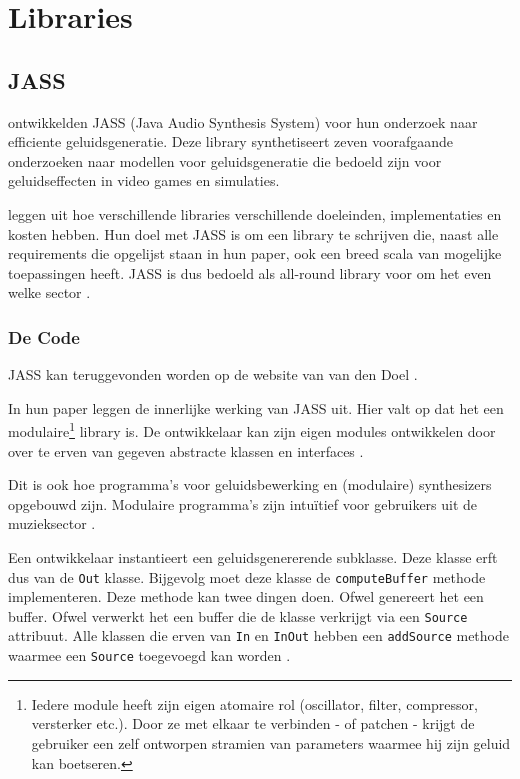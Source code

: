 \section{Libraries}

\subsection{JASS}

\textcite{jass} ontwikkelden JASS (Java Audio Synthesis System) voor hun onderzoek naar efficiente geluidsgeneratie. Deze library synthetiseert zeven voorafgaande onderzoeken naar modellen voor geluidsgeneratie die bedoeld zijn voor geluidseffecten in video games en simulaties. 

\textcite{jass} leggen uit hoe verschillende libraries verschillende doeleinden, implementaties en kosten hebben. Hun doel met JASS is om een library te schrijven die, naast alle requirements die opgelijst staan in hun paper, ook een breed scala van mogelijke toepassingen heeft. JASS is dus bedoeld als all-round library voor om het even welke sector \autocite{jass}.

\subsubsection*{De Code}
\label{sec:jass_code}

JASS kan teruggevonden worden op de website van van den Doel \autocite{jasscode}.

In hun paper leggen \textcite{jass} de innerlijke werking van JASS uit. Hier valt op dat het een modulaire\footnote{Iedere module heeft zijn eigen atomaire rol (oscillator, filter, compressor, versterker etc.). Door ze met elkaar te verbinden - of patchen - krijgt de gebruiker een zelf ontworpen stramien van parameters waarmee hij zijn geluid kan boetseren.} library is. De ontwikkelaar kan zijn eigen modules ontwikkelen door over te erven van gegeven abstracte klassen en interfaces  \autocite{jass}. 

Dit is ook hoe programma's voor geluidsbewerking en (modulaire) synthesizers opgebouwd zijn. Modulaire programma's zijn intuïtief voor gebruikers uit de muzieksector \autocite{bartvincent}.

Een ontwikkelaar instantieert een geluidsgenererende subklasse. Deze klasse erft dus van de \verb+Out+ klasse. Bijgevolg moet deze klasse de \verb+computeBuffer+ methode implementeren. Deze methode kan twee dingen doen. Ofwel genereert het een buffer. Ofwel verwerkt het een buffer die de klasse verkrijgt via een \verb+Source+ attribuut. Alle klassen die erven van \verb+In+ en \verb+InOut+ hebben een \verb+addSource+ methode waarmee een \verb+Source+ toegevoegd kan worden \autocite{jass}.

